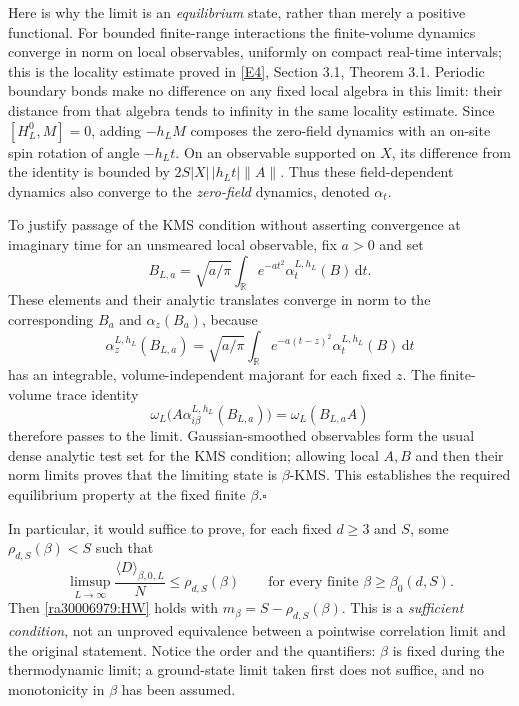 \documentclass[11pt]{article}
\newcommand{\R}{\mathbb{R}}
\newcommand{\dd}{\,\mathrm d}
\newcommand{\eref}[2]{\hyperlink{extra:#1:#2}{[E#2]}}
\begin{document}
	Here is why the limit is an \emph{equilibrium} state, rather than merely
	a positive functional. For bounded finite-range interactions the
	finite-volume dynamics converge in norm on local observables, uniformly
	on compact real-time intervals; this is the locality estimate proved in
	\eref{30006979}{4}, Section 3.1, Theorem 3.1. Periodic boundary bonds make no
	difference on any fixed local algebra in this limit: their distance
	from that algebra tends to infinity in the same locality estimate.
	Since $[H_L^0,M]=0$, adding $-h_LM$ composes the zero-field dynamics
	with an on-site spin rotation of angle $-h_Lt$. On an observable
	supported on $X$, its difference from the identity is bounded by
	$2S|X|\,|h_Lt|\|A\|$. Thus these field-dependent dynamics also converge
	to the \emph{zero-field} dynamics, denoted $\alpha_t$.
	
	To justify passage of the KMS condition without asserting convergence
	at imaginary time for an unsmeared local observable, fix $a>0$ and set
	\[
	B_{L,a}=\sqrt{a/\pi}\int_{\R} e^{-at^2}\alpha_t^{L,h_L}(B)\dd t.
	\]
	These elements and their analytic translates converge in norm to the
	corresponding $B_a$ and $\alpha_z(B_a)$, because
	\[
	\alpha_z^{L,h_L}(B_{L,a})
	=\sqrt{a/\pi}\int_{\R} e^{-a(t-z)^2}\alpha_t^{L,h_L}(B)\dd t
	\]
	has an integrable, volume-independent majorant for each fixed $z$.
	The finite-volume trace identity
	\[
	\omega_L\bigl(A\alpha_{i\beta}^{L,h_L}(B_{L,a})\bigr)
	=\omega_L(B_{L,a}A)
	\]
	therefore passes to the limit. Gaussian-smoothed observables form the
	usual dense analytic test set for the KMS condition; allowing local
	$A,B$ and then their norm limits proves that the limiting state is
	$\beta$-KMS. This establishes the required equilibrium property at the
	fixed finite $\beta$.\hfill$\square$
	
	In particular, it would suffice to prove, for each fixed $d\geq3$ and
	$S$, some $\rho_{d,S}(\beta)<S$ such that
	\begin{equation}\label{ra30006979:defectgoal}
		\limsup_{L\to\infty}\frac{\langle D\rangle_{\beta,0,L}}{N}
		\leq\rho_{d,S}(\beta)
		\qquad\text{for every finite }\beta\geq\beta_0(d,S).
	\end{equation}
	Then \eqref{ra30006979:HW} holds with $m_\beta=S-\rho_{d,S}(\beta)$.
	This is a \emph{sufficient condition}, not an unproved equivalence
	between a pointwise correlation limit and the original statement.
	Notice the order and the quantifiers: $\beta$ is fixed during the
	thermodynamic limit; a ground-state limit taken first does not suffice,
	and no monotonicity in $\beta$ has been assumed.
	
\end{document}
